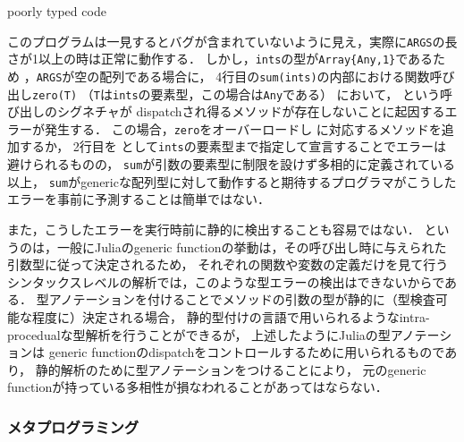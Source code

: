 \begin{listing}[ht]
  \inputminted[frame=lines]{julia}{src/parse_sum.jl}
  \caption{poorly typed code}
  \label{lst:target1}
\end{listing}

このプログラムは一見するとバグが含まれていないように見え，実際に\verb|ARGS|の長さが1以上の時は正常に動作する．
しかし，\verb|ints|の型が\verb|Array{Any,1}|であるため
\footnotemark %
，\verb|ARGS|が空の配列である場合に，
4行目の\verb|sum(ints)|の内部における関数呼び出し\verb|zero(T)|
（\verb|T|は\verb|ints|の要素型，この場合は\verb|Any|である）
において， という呼び出しのシグネチャが
dispatchされ得るメソッドが存在しないことに起因するエラーが発生する．
この場合，\verb|zero|をオーバーロードし  に対応するメソッドを追加するか，
2行目を  として\verb|ints|の要素型まで指定して宣言することでエラーは避けられるものの，
\verb|sum|が引数の要素型に制限を設けず多相的に定義されている以上，
\verb|sum|がgenericな配列型に対して動作すると期待するプログラマがこうしたエラーを事前に予測することは簡単ではない．


また，こうしたエラーを実行時前に静的に検出することも容易ではない．
というのは，一般にJuliaのgeneric functionの挙動は，その呼び出し時に与えられた引数型に従って決定されるため，
それぞれの関数や変数の定義だけを見て行うシンタックスレベルの解析では，このような型エラーの検出はできないからである．
型アノテーションを付けることでメソッドの引数の型が静的に（型検査可能な程度に）決定される場合，
静的型付けの言語で用いられるようなintra-procedualな型解析を行うことができるが，
上述したようにJuliaの型アノテーションは
generic functionのdispatchをコントロールするために用いられるものであり，
静的解析のために型アノテーションをつけることにより，
元のgeneric functionが持っている多相性が損なわれることがあってはならない．

\subsubsection{メタプログラミング} \label{subsubsection:metaprogramming}

